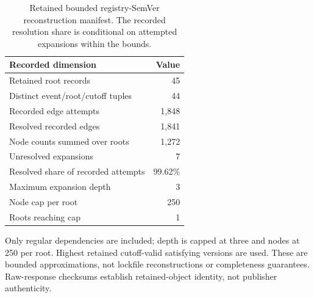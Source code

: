 \begin{table}[t]
\centering
\footnotesize
\caption{Retained bounded registry-SemVer reconstruction manifest. The recorded resolution share is conditional on attempted expansions within the bounds.}
\label{tab:q1_temporal_reconstruction}
\begin{tabular}{lr}
\toprule
Recorded dimension & Value\\
\midrule
Retained root records & 45\\
Distinct event/root/cutoff tuples & 44\\
Recorded edge attempts & 1,848\\
Resolved recorded edges & 1,841\\
Node counts summed over roots & 1,272\\
Unresolved expansions & 7\\
Resolved share of recorded attempts & 99.62\%\\
Maximum expansion depth & 3\\
Node cap per root & 250\\
Roots reaching cap & 1\\
\bottomrule
\end{tabular}
\par\smallskip\begin{minipage}{0.98\textwidth}\footnotesize Only regular dependencies are included; depth is capped at three and nodes at 250 per root. Highest retained cutoff-valid satisfying versions are used. These are bounded approximations, not lockfile reconstructions or completeness guarantees. Raw-response checksums establish retained-object identity, not publisher authenticity.\end{minipage}
\end{table}
